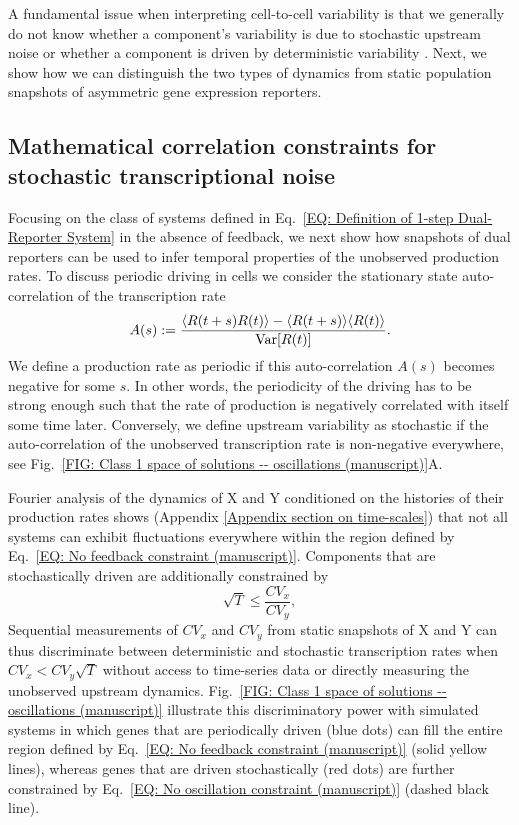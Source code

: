 \documentclass[%
 reprint,prx,
superscriptaddress,
%
%
%
%
%
%
%
%
%
 amsmath,amssymb,
 aps,
%
%
%
%
%
%
]{revtex4-2}
\newcommand{\lb}{\langle}
\newcommand{\rb}{\rangle}
\begin{document}
A fundamental issue when interpreting cell-to-cell variability is that we generally do not know whether a component's variability is due to stochastic upstream noise or whether a component is driven by deterministic variability {\cite{eling2019challenges}}. Next, we show how we can distinguish the two types of dynamics from static population snapshots of asymmetric gene expression reporters. 
\vspace{-.5em}
\subsection{Mathematical correlation constraints for stochastic transcriptional noise}
\vspace{-.75em}
Focusing on the class of systems defined in Eq.~\eqref{EQ: Definition of 1-step Dual-Reporter System} in the absence of feedback, we next show how snapshots of dual reporters can be used to infer temporal properties of the unobserved production rates. To discuss periodic driving in cells we consider the stationary state auto-correlation of the transcription rate
\begin{equation*}
A(s) : = \frac{\lb R(t+s) R(t) \rb - \lb R(t+s)\rb \lb R(t) \rb}{\Var[R(t)]}.
\end{equation*}
We define a production rate as periodic if this auto-correlation $A(s)$ becomes negative for some $s$. In other words, the periodicity of the driving has to be strong enough such that the rate of production is negatively correlated with itself some time later. 
%
Conversely, we define upstream variability as stochastic if the auto-correlation of the unobserved transcription rate is non-negative everywhere, see Fig.~\ref{FIG: Class 1 space of solutions -- oscillations (manuscript)}A.

Fourier analysis of the dynamics of X and Y conditioned on the histories of their production rates shows (Appendix \ref{Appendix section on time-scales}) that not all systems can exhibit fluctuations everywhere within the region defined by Eq.~\eqref{EQ: No feedback constraint (manuscript)}. Components that are stochastically driven are additionally constrained by
\begin{equation}
\sqrt{T} \leqslant \frac{CV_{x}}{CV_{y}}
\label{EQ: No oscillation constraint (manuscript)} ,
\end{equation}
Sequential measurements of $CV_x$ and $CV_y$ from static snapshots of X and Y can thus discriminate between deterministic and stochastic transcription rates when $CV_x < CV_y \sqrt{T}$ without access to time-series data or directly measuring the unobserved upstream dynamics.
{Fig.~\ref{FIG: Class 1 space of solutions -- oscillations (manuscript)} illustrate this discriminatory power with simulated systems in which genes that are periodically driven (blue dots) can fill the entire region defined by Eq.~\eqref{EQ: No feedback constraint (manuscript)} (solid yellow lines), whereas genes that are driven stochastically (red dots) are further constrained by Eq.~\eqref{EQ: No oscillation constraint (manuscript)} (dashed black line).}
%
\end{document}
